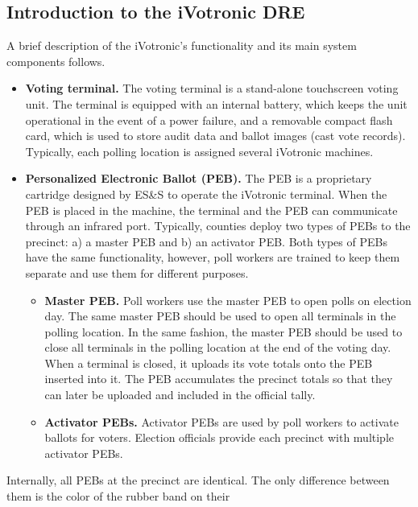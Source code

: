 \label{sec:background}
\smvertspace
\subsection{Introduction to the iVotronic DRE}
\smvertspace
A brief description of the iVotronic's functionality and its main
system components follows. 

\begin{itemize} 
\item \textbf{Voting terminal.} The voting terminal is a stand-alone
  touchscreen voting unit.  The terminal is equipped with an internal
  battery, which keeps the unit operational in the event of a power
  failure, and a removable compact flash card, which is used to store
  audit data and ballot images (cast vote records). Typically, each
  polling location is assigned several iVotronic machines.

\item \textbf{Personalized Electronic Ballot (PEB).} The PEB is a
  proprietary cartridge designed by ES\&S to operate the iVotronic
  terminal.  When the PEB is placed in the machine, the terminal and
  the PEB can communicate through an infrared port.  Typically,
  counties deploy two types of PEBs to the precinct: a) a master PEB
  and b) an activator PEB. Both types of PEBs have the same
  functionality, however, poll workers are trained to keep them
  separate and use them for different purposes. 
    \begin{itemize}
    \item \textbf{Master PEB.}  Poll workers use the master PEB to
      open polls on election day. The same
      master PEB should be used to open all terminals in the polling
      location. In the same fashion, the master PEB should be used to
      close all terminals in the polling location at the end of the
      voting day. When a terminal is closed, it uploads its vote
      totals onto the PEB inserted into it. The PEB accumulates the precinct
      totals so that they can later be uploaded and included in the
      official tally. 
    \item \textbf{Activator PEBs.}  Activator PEBs are used by  poll
      workers to activate ballots for voters. Election officials
      provide each precinct with multiple activator PEBs.  
    \end{itemize}
\end{itemize}
Internally, all PEBs at the precinct are identical. The only
difference between them is the color of the rubber band on their
